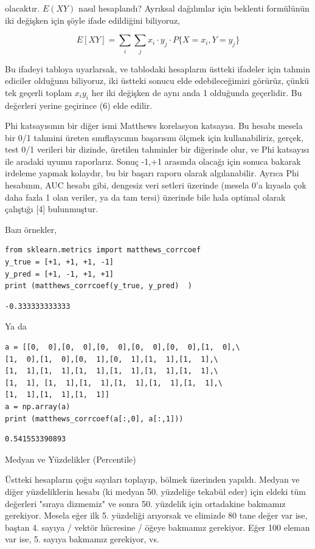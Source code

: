 \documentclass[12pt,fleqn]{article}\usepackage{../../common}
\begin{document}
olacaktır. $E(XY)$ nasıl hesaplandı? Ayrıksal dağılımlar için beklenti
formülünün iki değişken için şöyle ifade edildiğini biliyoruz,

$$  E[XY] = \sum_i\sum_j x_i\cdot y_j \cdot P\{X = x_i, Y = y_j\} $$

Bu ifadeyi tabloya uyarlarsak, ve tablodaki hesapların üstteki ifadeler
için tahmin ediciler olduğunu biliyoruz, iki üstteki sonucu elde
edebileceğimizi görürüz, çünkü tek geçerli toplam $x_i y_i$ her iki
değişken de aynı anda 1 olduğunda geçerlidir. Bu değerleri yerine geçirince
(6) elde edilir.

Phi katsayısının bir diğer ismi Matthews korelasyon katsayısı. Bu hesabı
mesela bir 0/1 tahmini üreten sınıflayıcının başarısını ölçmek için
kullanabiliriz, gerçek, test 0/1 verileri bir dizinde, üretilen tahminler
bir diğerinde olur, ve Phi katsayısı ile aradaki uyumu raporlarız. Sonuç
-1,+1 arasında olacağı için sonuca bakarak irdeleme yapmak kolaydır, bu bir
başarı raporu olarak algılanabilir. Ayrıca Phi hesabının, AUC hesabı gibi,
dengesiz veri setleri üzerinde (mesela 0'a kıyasla çok daha fazla 1 olan
veriler, ya da tam tersi) üzerinde bile hala optimal olarak çalıştığı [4]
bulunmuştur.

Bazı örnekler,

\begin{verbatim}
from sklearn.metrics import matthews_corrcoef
y_true = [+1, +1, +1, -1]
y_pred = [+1, -1, +1, +1]
print (matthews_corrcoef(y_true, y_pred)  )
\end{verbatim}

\begin{verbatim}
-0.333333333333
\end{verbatim}

Ya da

\begin{verbatim}
a = [[0,  0],[0,  0],[0,  0],[0,  0],[0,  0],[1,  0],\
[1,  0],[1,  0],[0,  1],[0,  1],[1,  1],[1,  1],\
[1,  1],[1,  1],[1,  1],[1,  1],[1,  1],[1,  1],\
[1,  1], [1,  1],[1,  1],[1,  1],[1,  1],[1,  1],\
[1,  1],[1,  1],[1,  1]]
a = np.array(a)
print (matthews_corrcoef(a[:,0], a[:,1]))
\end{verbatim}

\begin{verbatim}
0.541553390893
\end{verbatim}

Medyan ve Yüzdelikler (Percentile)

Üstteki hesapların çoğu sayıları toplayıp, bölmek üzerinden yapıldı. Medyan
ve diğer yüzdeliklerin hesabı (ki medyan 50. yüzdeliğe tekabül eder) için
eldeki tüm değerleri "sıraya dizmemiz" ve sonra 50. yüzdelik için
ortadakine bakmamız gerekiyor. Mesela eğer ilk 5. yüzdeliği arıyorsak ve
elimizde 80 tane değer var ise, baştan 4. sayıya / vektör hücresine / öğeye
bakmamız gerekiyor. Eğer 100 eleman var ise, 5. sayıya bakmamız gerekiyor,
vs.
\end{document}
